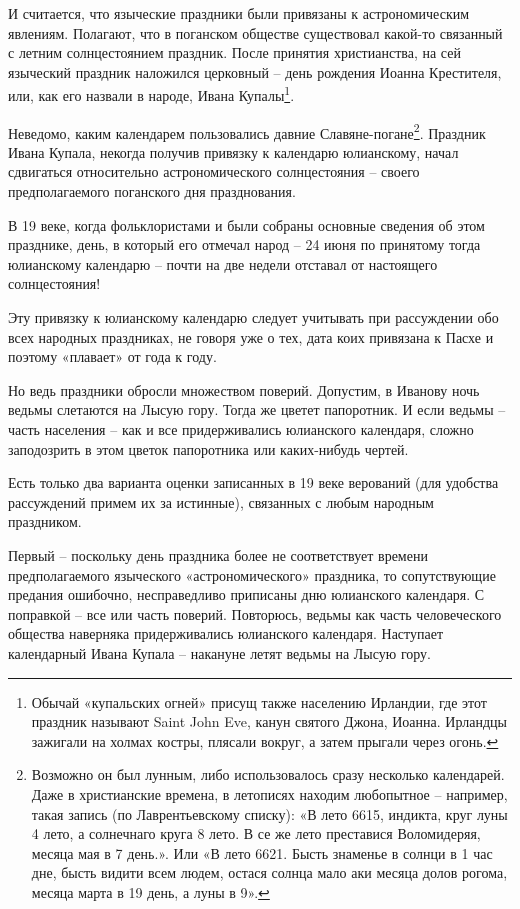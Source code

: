 И считается, что языческие праздники были привязаны к астрономическим явлениям. Полагают, что в поганском обществе существовал какой-то связанный с летним солнцестоянием праздник. После принятия христианства, на сей языческий праздник наложился церковный – день рождения Иоанна Крестителя, или, как его назвали в народе, Ивана Купалы\footnote{Обычай «купальских огней» присущ также населению Ирландии, где этот праздник называют Saint John Eve, канун святого Джона, Иоанна. Ирландцы зажигали на холмах костры, плясали вокруг, а затем прыгали через огонь.}.

Неведомо, каким календарем пользовались давние Славяне-погане\footnote{Возможно он был лунным, либо использовалось сразу несколько календарей. Даже в христианские времена, в летописях находим любопытное – например, такая запись (по Лаврентьевскому списку): «В лето 6615, индикта, круг луны 4 лето, а солнечнаго круга 8 лето. В се же лето преставися Воломидеряя, месяца мая в 7 день.». Или «В лето 6621. Бысть знаменье в солнци в 1 час дне, бысть видити всем людем, остася солнца мало аки месяца долов рогома, месяца марта в 19 день, а луны в 9».}. Праздник Ивана Купала, некогда получив привязку к календарю юлианскому, начал сдвигаться относительно астрономического солнцестояния – своего предполагаемого поганского дня празднования.

В 19 веке, когда фольклористами и были собраны основные сведения об этом празднике, день, в который его отмечал народ – 24 июня по принятому тогда юлианскому календарю – почти на две недели отставал от настоящего солнцестояния!

Эту привязку к юлианскому календарю следует учитывать при рассуждении обо всех народных праздниках, не говоря уже о тех, дата коих привязана к Пасхе и поэтому «плавает» от года к году.

Но ведь праздники обросли множеством поверий. Допустим, в Иванову ночь ведьмы слетаются на Лысую гору. Тогда же цветет папоротник. И если ведьмы – часть населения – как и все придерживались юлианского календаря, сложно заподозрить в этом цветок папоротника или каких-нибудь чертей.

Есть только два варианта оценки записанных в 19 веке верований (для удобства рассуждений примем их за истинные), связанных с любым народным праздником.

Первый – поскольку день праздника более не соответствует времени предполагаемого языческого «астрономического» праздника, то сопутствующие предания ошибочно, несправедливо приписаны дню юлианского календаря. С поправкой – все или часть поверий. Повторюсь, ведьмы как часть человеческого общества наверняка придерживались юлианского календаря. Наступает календарный Ивана Купала – накануне летят ведьмы на Лысую гору.

